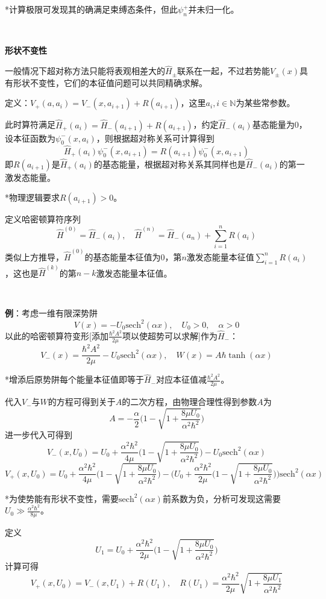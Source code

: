 \documentclass[a4paper,UTF8,fontset=windows]{ctexart}
\begin{document}
*计算极限可发现其的确满足束缚态条件，但此$\psi_n^+$并未归一化。

\

\textbf{形状不变性}

一般情况下超对称方法只能将表观相差大的$\hat{H}_\pm$联系在一起，不过若势能$V_\pm(x)$具有形状不变性，它们的本征值问题可以共同精确求解。

定义：$V_+(a,a_i)=V_-(x,a_{i+1})+R(a_{i+1})$，这里$a_i,i\in\mathbb{N}$为某些常参数。

此时算符满足$\hat{H}_+(a_i)=\hat{H}_-(a_{i+1})+R(a_{i+1})$，约定$\hat{H}_-(a_i)$基态能量为0，设本征函数为$\psi_0^-(x,a_{i})$，则根据超对称关系可计算得到
$$\hat{H}_+(a_i)\psi_0^-(x,a_{i+1})=R(a_{i+1})\psi_0^-(x,a_{i+1})$$
即$R(a_{i+1})$是$\hat{H}_+(a_i)$的基态能量，根据超对称关系其同样也是$\hat{H}_-(a_i)$的第一激发态能量。

*物理逻辑要求$R(a_{i+1})>0$。

定义哈密顿算符序列
$$\hat{H}^{(0)}=\hat{H}_-(a_i),\quad\hat{H}^{(n)}=\hat{H}_-(a_n)+\sum_{i=1}^nR(a_i)$$
类似上方推导，$\hat{H}^{(0)}$的基态能量本征值为0，第$n$激发态能量本征值$\sum_{i=1}^nR(a_i)$，这也是$\hat{H}^{(k)}$的第$n-k$激发态能量本征值。

\

\textbf{例}：考虑一维有限深势阱
$$V(x)=-U_0\mathrm{sech}^2(\alpha x),\quad U_0>0,\quad\alpha>0$$
以此的哈密顿算符变形[添加$\frac{\hbar^2A^2}{2\mu}$项以使超势可以求解]作为$\hat{H}_-$：
$$V_-(x)=\frac{\hbar^2A^2}{2\mu}-U_0\mathrm{sech}^2(\alpha x),\quad W(x)=A\hbar\tanh(\alpha x)$$

*增添后原势阱每个能量本征值即等于$\hat{H}_-$对应本征值减$\frac{\hbar^2A^2}{2\mu}$。

代入$V_-$与$W$的方程可得到关于$A$的二次方程，由物理合理性得到参数$A$为
$$A=-\frac{\alpha}{2}\bigg(1-\sqrt{1+\frac{8\mu U_0}{\alpha^2\hbar^2}}\bigg)$$
进一步代入可得到
$$V_-(x,U_0)=U_0+\frac{\alpha^2\hbar^2}{4\mu}\bigg(1-\sqrt{1+\frac{8\mu U_0}{\alpha^2\hbar^2}}\bigg)-U_0\mathrm{sech}^2(\alpha x)$$
$$V_+(x,U_0)=U_0+\frac{\alpha^2\hbar^2}{4\mu}\bigg(1-\sqrt{1+\frac{8\mu U_0}{\alpha^2\hbar^2}}\bigg)-\bigg(U_0+\frac{\alpha^2\hbar^2}{2\mu}\bigg(1-\sqrt{1+\frac{8\mu U_0}{\alpha^2\hbar^2}}\bigg)\bigg)\mathrm{sech}^2(\alpha x)$$

*为使势能有形状不变性，需要$\mathrm{sech}^2(\alpha x)$前系数为负，分析可发现这需要$U_0\gg\frac{\alpha^2\hbar^2}{8\mu}$。

定义
$$U_1=U_0+\frac{\alpha^2\hbar^2}{2\mu}\bigg(1-\sqrt{1+\frac{8\mu U_0}{\alpha^2\hbar^2}}\bigg)$$
计算可得
$$V_+(x,U_0)=V_-(x,U_1)+R(U_1),\quad R(U_1)=\frac{\alpha^2\hbar^2}{2\mu}\sqrt{1+\frac{8\mu U_1}{\alpha^2\hbar^2}}$$
\end{document}
